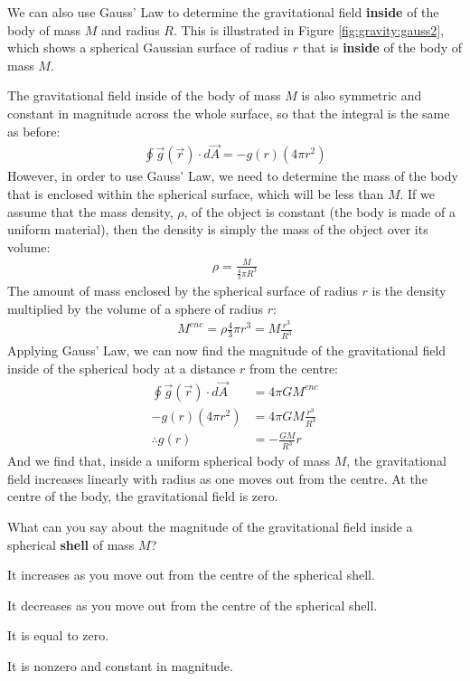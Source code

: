 We can also use Gauss' Law to determine the gravitational field \textbf{inside} of the body of mass $M$ and radius $R$. This is illustrated in Figure \ref{fig:gravity:gauss2}, which shows a spherical Gaussian surface of radius $r$ that is \textbf{inside} of the body of mass $M$.

The gravitational field inside of the body of mass $M$ is also symmetric 
and  constant in magnitude across the whole surface, %
so that the integral is the same as before:
\begin{align*}
\oint \vec g(\vec r) \cdot d\vec A=-g(r)(4\pi r^2)
\end{align*}
However, in order to use Gauss' Law, we need to determine the mass of the body that is enclosed within the spherical surface, which will be less than $M$. If we assume that the mass density, $\rho$, of the object is constant (the body is made of a uniform material), then the density is simply the mass of the object over its volume:
\begin{align*}
\rho = \frac{M}{\frac{4}{3}\pi R^3}
\end{align*}
The amount of mass enclosed by the spherical surface of radius $r$ is the density multiplied by the volume of a sphere of radius $r$:
\begin{align*}
M^{enc} = \rho \frac{4}{3}\pi r^3 = M\frac{r^3}{R^3}
\end{align*}
Applying Gauss' Law, we can now find the magnitude of the gravitational field inside of the spherical body at a distance $r$ from the centre:
\begin{align*}
\oint \vec g(\vec r) \cdot d\vec A &= 4\pi G M^{enc}\\
-g(r)(4\pi r^2) &= 4\pi G M\frac{r^3}{R^3}\\
\therefore g(r) &= - \frac{G M}{R^3}r
\end{align*}
And we find that, inside a uniform spherical body of mass $M$, the gravitational field increases linearly with radius as one moves out from the centre. At the centre of the body, the gravitational field is zero. 

\begin{checkpoint}
\begin{MCquestion}{What can you say about the magnitude of the gravitational field inside a spherical \textbf{shell} of mass $M$?}
\item It increases as you move out from the centre of the spherical shell. 
\item It decreases as you move out from the centre of the spherical shell. 
\item It is equal to zero. \correct
\item It is nonzero and constant in magnitude.
\end{MCquestion}
\end{checkpoint}

